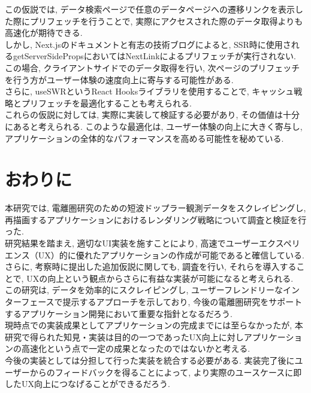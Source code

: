 この仮説では, データ検索ページで任意のデータページへの遷移リンクを表示した際にプリフェッチを行うことで, 実際にアクセスされた際のデータ取得よりも高速化が期待できる. \\
しかし, Next.jsのドキュメントと有志の技術ブログによると, SSR時に使用されるgetServerSidePropsにおいてはNextLinkによるプリフェッチが実行されない. 
この場合, クライアントサイドでのデータ取得を行い, 次ページのプリフェッチを行う方がユーザー体験の速度向上に寄与する可能性がある.\cite{no9} \\
さらに, useSWRというReact Hooksライブラリを使用することで, キャッシュ戦略とプリフェッチを最適化することも考えられる.\cite{no10} \\
これらの仮説に対しては, 実際に実装して検証する必要があり, その価値は十分にあると考えられる. 
このような最適化は, ユーザー体験の向上に大きく寄与し, アプリケーションの全体的なパフォーマンスを高める可能性を秘めている. 


\section{おわりに}
本研究では, 電離圏研究のための短波ドップラー観測データをスクレイピングし, 再描画するアプリケーションにおけるレンダリング戦略について調査と検証を行った. \\
研究結果を踏まえ, 適切なUI実装を施すことにより, 高速でユーザーエクスペリエンス（UX）的に優れたアプリケーションの作成が可能であると確信している. 
さらに, 考察時に提出した追加仮説に関しても, 調査を行い, それらを導入することで, UXの向上という観点からさらに有益な実装が可能になると考えられる. \\
この研究は, データを効率的にスクレイピングし, ユーザーフレンドリーなインターフェースで提示するアプローチを示しており, 今後の電離圏研究をサポートするアプリケーション開発において重要な指針となるだろう. \\
現時点での実装成果としてアプリケーションの完成までには至らなかったが, 本研究で得られた知見・実装は目的の一つであったUX向上に対しアプリケーションの高速化という点で一定の成果となったのではないかと考える.\\
今後の実装としては分担して行った実装を統合する必要がある. 実装完了後にユーザーからのフィードバックを得ることによって, より実際のユースケースに即したUX向上につなげることができるだろう.

